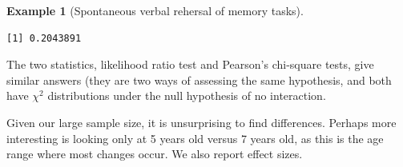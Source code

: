 \documentclass[
  11pt,
  letterpaper,
]{scrbook}
\newenvironment{Shaded}{\begin{snugshade}}{\end{snugshade}}
\newcommand{\AttributeTok}[1]{\textcolor[rgb]{0.40,0.45,0.13}{#1}}
\newcommand{\CommentTok}[1]{\textcolor[rgb]{0.37,0.37,0.37}{#1}}
\newcommand{\ConstantTok}[1]{\textcolor[rgb]{0.56,0.35,0.01}{#1}}
\newcommand{\DecValTok}[1]{\textcolor[rgb]{0.68,0.00,0.00}{#1}}
\newcommand{\FunctionTok}[1]{\textcolor[rgb]{0.28,0.35,0.67}{#1}}
\newcommand{\NormalTok}[1]{\textcolor[rgb]{0.00,0.23,0.31}{#1}}
\newcommand{\OtherTok}[1]{\textcolor[rgb]{0.00,0.23,0.31}{#1}}
\newcommand{\SpecialCharTok}[1]{\textcolor[rgb]{0.37,0.37,0.37}{#1}}
\newcommand{\StringTok}[1]{\textcolor[rgb]{0.13,0.47,0.30}{#1}}
\theoremstyle{definition}
\theoremstyle{definition}
\newtheorem{example}{Example}[chapter]
\theoremstyle{remark}
\begin{document}
\begin{example}[Spontaneous verbal rehersal of memory
tasks]
\begin{verbatim}
[1] 0.2043891
\end{verbatim}

\begin{Shaded}
\end{Shaded}

The two statistics, likelihood ratio test and Pearson's chi-square
tests, give similar answers (they are two ways of assessing the same
hypothesis, and both have \(\chi^2\) distributions under the null
hypothesis of no interaction.

Given our large sample size, it is unsurprising to find differences.
Perhaps more interesting is looking only at 5 years old versus 7 years
old, as this is the age range where most changes occur. We also report
effect sizes.


\end{example}
\end{document}
